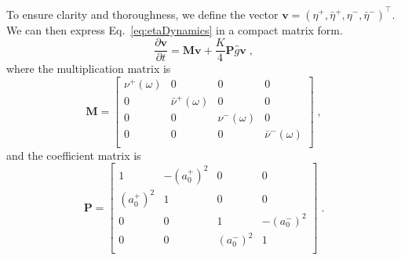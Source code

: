 \documentclass{article}
\begin{document}
To ensure clarity and thoroughness, we define the vector $\mathbf{v}=\left( \eta ^+,\bar{\eta}^+,\eta ^-,\bar{\eta}^- \right)^{\top} $. 
We can then express Eq.~\eqref{eq:etaDynamics} in a compact matrix form.
\begin{equation}
    \label{eq:matrixDynamics}
    \frac{\partial \mathbf{v}}{\partial t}=\mathbf{M}\mathbf{v}+\frac{K}{4}\mathbf{P}\hat{g}\mathbf{v}\;,
\end{equation}
where the multiplication matrix is
\begin{equation}
    \mathbf{M}=\left[ \begin{matrix}
        \nu ^+\left( \omega \right)&		0&		0&		0\\
        0&		\bar{\nu}^+\left( \omega \right)&		0&		0\\
        0&		0&		\nu ^-\left( \omega \right)&		0\\
        0&		0&		0&		\bar{\nu}^-\left( \omega \right)\\
    \end{matrix} \right] \;,
\end{equation}
and the coefficient matrix is
\begin{equation}
    \mathbf{P}=\left[ \begin{matrix}
        1&		-\left( a_{0}^{+} \right) ^2&		0&		0\\
        \left( a_{0}^{+} \right) ^2&		1&		0&		0\\
        0&		0&		1&		-\left( a_{0}^{-} \right) ^2\\
        0&		0&		\left( a_{0}^{-} \right) ^2&		1\\
    \end{matrix} \right] \;.
\end{equation}
\end{document}
